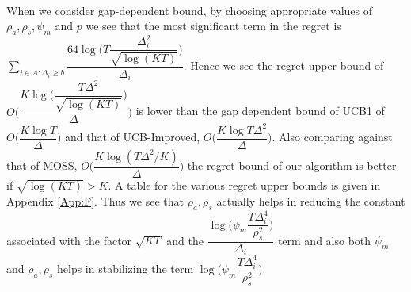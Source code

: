 \paragraph*{}When we consider gap-dependent bound, by choosing appropriate values of $\rho_{a},\rho_{s},\psi_{m}$ and $p$ we see that the most significant term in the regret is $\sum_{i\in A:\Delta_{i}\geq b}\dfrac{64\log{\big(T\dfrac{\Delta_{i}^{2}}{\sqrt{\log (KT)}}\big)}}{\Delta_{i}}$. Hence we see the regret upper bound of $O\bigg(\dfrac{K\log \big(\dfrac{T\Delta^{2}}{\sqrt{\log (KT)}}\big)}{\Delta}\bigg)$ is lower than the gap dependent bound of UCB1 of $O\bigg(\dfrac{K\log T}{\Delta}\bigg)$ and that of UCB-Improved, $O\bigg(\dfrac{K\log T\Delta^{2}}{\Delta}\bigg)$. Also comparing against that of MOSS, $O\bigg(\dfrac{K\log(T\Delta^{2}/K)}{\Delta}\bigg)$ the regret bound of our algorithm is better if $\sqrt{\log(KT)}>K$. A table for the various regret upper bounds is given in Appendix \ref{App:F}. Thus we see that $\rho_{a},\rho_{s}$ actually helps in reducing the constant associated with the factor $\sqrt{KT}$ and the $\dfrac{\log\bigg(\psi_{m}\dfrac{T\Delta_{i}^{4}}{\rho_{s}^{2}}\bigg)}{\Delta_{i}}$ 
term and also both $\psi_{m}$ and $\rho_{a},\rho_{s}$ helps in stabilizing the term $\log\bigg(\psi_{m}\dfrac{T\Delta_{i}^{4}}{\rho_{s}^{2}}\bigg)$.


%
%


